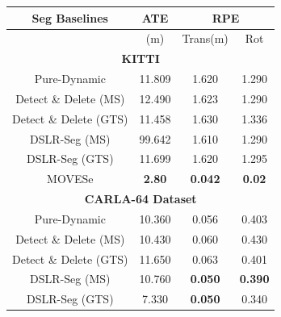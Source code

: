 \documentclass[10pt,twocolumn,letterpaper]{article}
\begin{document}
\begin{table}[htbp]
\centering
\begin{tabular}{|cccc|}
\hline
\multicolumn{1}{|c|}{\textbf{Seg Baselines}}                  & \multicolumn{1}{c|}{\textbf{ATE}}    & \multicolumn{2}{c|}{\textbf{RPE}}              \\ \hline
\multicolumn{1}{|c|}{}                       & \multicolumn{1}{c|}{(m)}    & \multicolumn{1}{c|}{Trans(m)} & Rot   \\ \hline
\multicolumn{4}{|c|}{\textbf{KITTI} }                                         \\ \hline
\multicolumn{1}{|c|}{Pure-Dynamic}           & \multicolumn{1}{c|}{11.809} & \multicolumn{1}{c|}{1.620}    & 1.290 \\ \hline
\multicolumn{1}{|c|}{Detect \& Delete (MS)}  & \multicolumn{1}{c|}{12.490} & \multicolumn{1}{c|}{1.623}    & 1.290 \\ \hline
\multicolumn{1}{|c|}{Detect \& Delete (GTS)} & \multicolumn{1}{c|}{11.458} & \multicolumn{1}{c|}{1.630}    & 1.336 \\ \hline
\multicolumn{1}{|c|}{DSLR-Seg (MS)}          & \multicolumn{1}{c|}{99.642} & \multicolumn{1}{c|}{1.610}    & 1.290 \\ \hline
\multicolumn{1}{|c|}{DSLR-Seg (GTS)}         & \multicolumn{1}{c|}{11.699} & \multicolumn{1}{c|}{1.620}    & 1.295 \\ \hline
\multicolumn{1}{|c|}{MOVESe}                  & \multicolumn{1}{c|}{\textbf{2.80}} & \multicolumn{1}{c|}{\textbf{0.042}}    & \textbf{0.02} \\ \hline
\multicolumn{4}{|c|}{\textbf{CARLA-64 Dataset}}                                                                             \\ \hline
\multicolumn{1}{|c|}{Pure-Dynamic}           & \multicolumn{1}{c|}{10.360} & \multicolumn{1}{c|}{0.056}    & 0.403 \\ \hline
\multicolumn{1}{|c|}{Detect \& Delete (MS)}  & \multicolumn{1}{c|}{10.430} & \multicolumn{1}{c|}{0.060}    & 0.430 \\ \hline
\multicolumn{1}{|c|}{Detect \& Delete (GTS)} & \multicolumn{1}{c|}{11.650} & \multicolumn{1}{c|}{0.063}    & 0.401 \\ \hline
\multicolumn{1}{|c|}{DSLR-Seg (MS)}          & \multicolumn{1}{c|}{10.760} & \multicolumn{1}{c|}{\textbf{0.050}}    & \textbf{0.390} \\ \hline
\multicolumn{1}{|c|}{DSLR-Seg (GTS)}         & \multicolumn{1}{c|}{7.330}  & \multicolumn{1}{c|}{\textbf{0.050}}    & 0.340 \\ \hline

\end{tabular}
\end{table}
\end{document}
